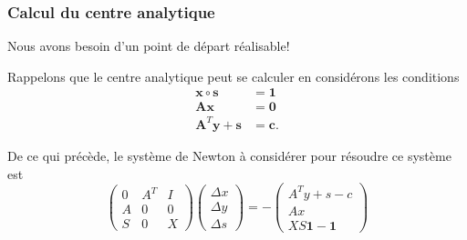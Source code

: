 \documentclass[usepdftitle=false, aspectratio=169]{beamer}
\def\bc{\boldsymbol{c}}
\def\bs{\boldsymbol{s}}
\def\bx{\boldsymbol{x}}
\def\by{\boldsymbol{y}}
\def\bA{\boldsymbol{A}}
\def\bzero{\boldsymbol{0}}
\def\bone{\boldsymbol{1}}
\begin{document}







\begin{frame}
	\frametitle{Calcul du centre analytique}

Nous avons besoin d'un point de départ réalisable!

\mbox{}
	
	Rappelons que le centre analytique peut se calculer en considérons les conditions
	\begin{align*}
		\bx \circ \bs &= \bone \\
		\bA\bx &= \bzero \\
		\bA^T\by + \bs & = \bc.
	\end{align*}

\mbox{}

De ce qui précède, le système de Newton à considérer pour résoudre ce système est
$$
\begin{pmatrix}
	0 & A^T & I \\
	A & 0 & 0 \\
	S & 0 & X
\end{pmatrix}
\begin{pmatrix}
	\Delta x \\ \Delta y \\ \Delta s
\end{pmatrix}
=
-
\begin{pmatrix}
	A^Ty+s-c \\ Ax \\ XS\bone - \bone
\end{pmatrix}
$$
	
\end{frame}
\end{document}
